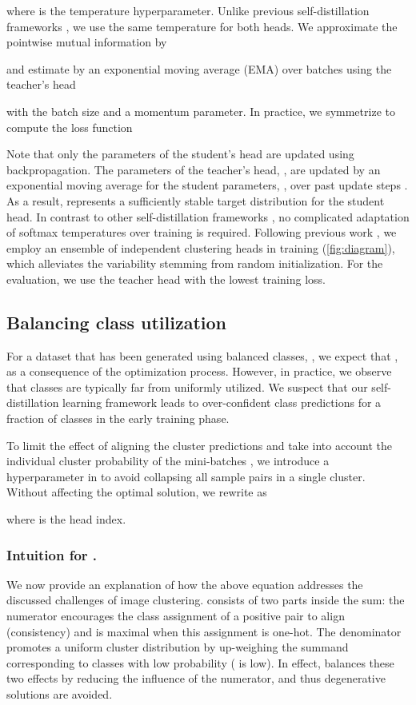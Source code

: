 \documentclass{bmvc2k}
\begin{document}
where  is the temperature hyperparameter. Unlike previous self-distillation frameworks \cite{dino}, we use the same temperature  for both heads. We approximate the pointwise mutual information by 

and estimate  by an exponential moving average (EMA) over batches using the teacher's head

with  the batch size and  a momentum parameter. In practice, we symmetrize  to compute the loss function

Note that only the parameters  of the student's head are updated using backpropagation. The parameters of the teacher's head, , are updated by an exponential moving average for the student parameters, , over past update steps \cite{dino,byol}. As a result,  represents a sufficiently stable target distribution for the student head. In contrast to other self-distillation frameworks \cite{dino}, no complicated adaptation of softmax temperatures over training is required. Following previous work \cite{scan}, we employ an ensemble of  independent clustering heads in training (\cref{fig:diagram}), which alleviates the variability stemming from random initialization. For the evaluation, we use the teacher head with the lowest training loss. 



\subsection{Balancing class utilization}
For a dataset  that has been generated using balanced classes, , we expect that , as a consequence of the optimization process. However, in practice, we observe that classes are typically far from uniformly utilized. We suspect that our self-distillation learning framework leads to over-confident class predictions for a fraction of classes in the early training phase. 

To limit the effect of aligning the cluster predictions and take into account the individual cluster probability of the mini-batches , we introduce a hyperparameter  in  to avoid collapsing all sample pairs in a single cluster. Without affecting the optimal solution, we rewrite  as





where  is the head index. 

\subsubsection{Intuition for .} We now provide an explanation of how the above equation addresses the discussed challenges of image clustering.  consists of two parts inside the  sum: the numerator  encourages the class assignment of a positive pair to align (consistency) and is maximal when this assignment is one-hot. The denominator  promotes a uniform cluster distribution by up-weighing the summand corresponding to classes with low probability ( is low). In effect,  balances these two effects by reducing the influence of the numerator, and thus degenerative solutions are avoided. 
\end{document}
